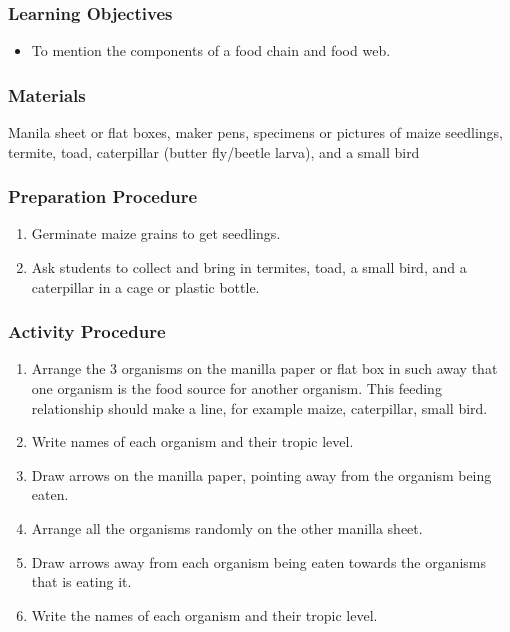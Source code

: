 \subsubsection*{Learning Objectives}
\begin{itemize}
\item{To mention the components of a food chain and food web.}
\end{itemize}

\subsubsection*{Materials}
Manila sheet or flat boxes, maker pens, specimens or pictures of maize seedlings, termite, toad, caterpillar (butter fly/beetle larva), and a small bird

\subsubsection*{Preparation Procedure}
\begin{enumerate}
\item{Germinate maize grains to get seedlings.}
\item{Ask students to collect and bring in termites, toad, a small bird, and a caterpillar in a cage or plastic bottle.}
\end{enumerate}

\subsubsection*{Activity Procedure}
\begin{enumerate}

\item{Arrange the 3 organisms on the manilla paper or flat box in such away that one organism is the food source for another organism. This feeding relationship should make a line, for example maize, caterpillar, small bird.}
\item{Write names of each organism and their tropic level.}
\item{Draw arrows on the manilla paper, pointing away from the organism being eaten.}
\item{Arrange all the organisms randomly on the other manilla sheet.}
\item{Draw arrows away from each organism being eaten towards the organisms that is eating it.}
\item{Write the names of each organism and their tropic level.}

\end{enumerate}

